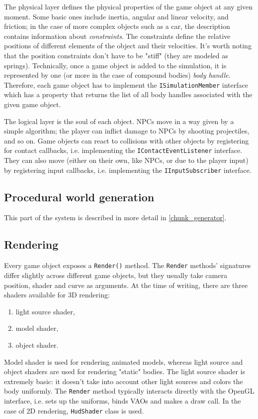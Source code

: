 The physical layer defines the physical properties of the game object at any given moment.
Some basic ones include inertia, angular and linear velocity, and friction;
in the case of more complex objects such as a car, the description contains information about \textit{constraints}.
The constraints define the relative positions of different elements of the object and their velocities.
It's worth noting that the position constraints don't have to be "stiff" (they are modeled as springs).
Technically, once a game object is added to the simulation, it is represented by one (or more in the case of compound bodies) \textit{body handle}.
Therefore, each game object has to implement the \texttt{ISimulationMember} interface which has a property that returns the list of all body handles associated with the given game object.

The logical layer is the soul of each object.
NPCs move in a way given by a simple algorithm;
the player can inflict damage to NPCs by shooting projectiles, and so on.
Game objects can react to collisions with other objects by registering for contact callbacks, i.e. implementing the \texttt{IContactEventListener} interface.
They can also move (either on their own, like NPCs, or due to the player input) by registering input callbacks, i.e. implementing the \texttt{IInputSubscriber} interface.

\subsection{Procedural world generation}
This part of the system is described in more detail in \ref{chunk_generator}.

\subsection{Rendering}
Every game object exposes a \texttt{Render()} method.
The \texttt{Render} methods' signatures differ slightly across different game objects, but they usually take camera position, shader and curve as arguments.
At the time of writing, there are three shaders available for 3D rendering:
\begin{enumerate}
    \item light source shader,
    \item model shader,
    \item object shader.
\end{enumerate}
Model shader is used for rendering animated models, whereas light source and object shaders are used for rendering "static" bodies.
The light source shader is extremely basic: it doesn't take into account other light sources and colors the body uniformly.
The \texttt{Render} method typically interacts directly with the OpenGL interface, i.e. sets up the uniforms, binds VAOs and makes a draw call.
In the case of 2D rendering, \texttt{HudShader} class is used.

